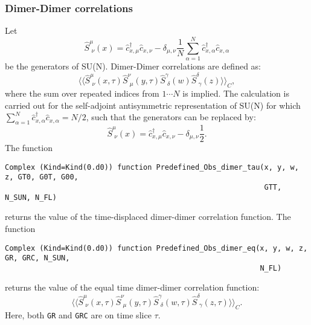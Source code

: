 \subsubsection{Dimer-Dimer correlations }
Let  
\begin{equation}
\hat{S}^{\mu}_{\, \,  \nu} (x)  =  \hat{c}^{\dagger}_{x,\mu} \hat{c}^{}_{x,\nu}    - \delta_{\mu,\nu} \frac{1}{N}  \sum_{\alpha = 1}^{N} \hat{c}^{\dagger}_{x,\alpha} \hat{c}^{}_{x,\alpha}
\end{equation}
be the generators of SU(N). 
Dimer-Dimer correlations are defined  as: 
\begin{equation}
\langle \langle \hat{S}^{\mu}_{\, \,  \nu} (x,\tau)   \hat{S}^{\nu}_{\, \,  \mu} (y,\tau) 
\hat{S}^{\gamma}_{\, \,  \delta} (w)   \hat{S}^{\delta}_{\, \,  \gamma} (z)   \rangle   \rangle_C  ,
\end{equation}
where the sum   over repeated indices   from $ 1 \cdots N $ is implied. 
The calculation is carried out  for the self-adjoint antisymmetric  representation of SU(N)   for which $ \sum_{\alpha = 1}^{N} \hat{c}^{\dagger}_{x,\alpha} \hat{c}^{}_{x,\alpha}  = N/2$,   such that the generators can be replaced by: 
\begin{equation}
\hat{S}^{\mu}_{\, \,  \nu} (x)  =  \hat{c}^{\dagger}_{x,\mu} \hat{c}^{}_{x,\nu}    - \delta_{\mu,\nu} \frac{1}{2}. 
\end{equation}
The  function 
\begin{lstlisting}[style=fortran]
Complex (Kind=Kind(0.d0)) function Predefined_Obs_dimer_tau(x, y, w, z, GT0, G0T, G00,
                                                            GTT, N_SUN, N_FL)  
\end{lstlisting}
returns the   value of the time-displaced dimer-dimer correlation function. 
The  function 
\begin{lstlisting}[style=fortran]
Complex (Kind=Kind(0.d0)) function Predefined_Obs_dimer_eq(x, y, w, z, GR, GRC, N_SUN,
                                                           N_FL)
\end{lstlisting}
returns the   value of the equal time  dimer-dimer correlation function:
\begin{equation}
\langle \langle \hat{S}^{\mu}_{\, \,  \nu} (x,\tau)   \hat{S}^{\nu}_{\, \,  \mu} (y,\tau) 
\hat{S}^{\gamma}_{\, \,  \delta} (w,\tau)   \hat{S}^{\delta}_{\, \,  \gamma} (z,\tau)   \rangle   \rangle_C.  
\end{equation}
Here,  both \texttt{GR}  and  \texttt{GRC}  are on time slice  $\tau$.

